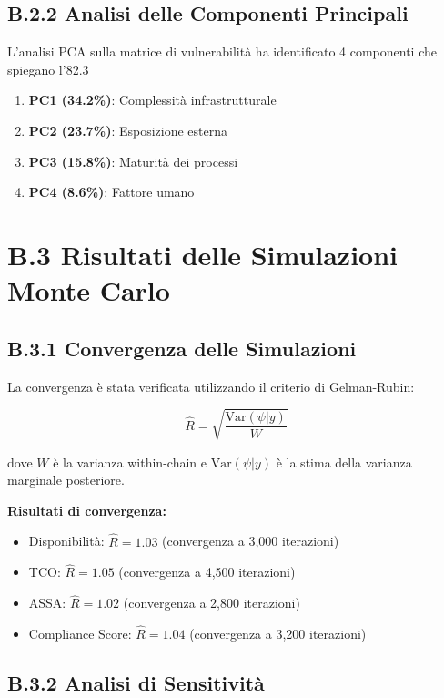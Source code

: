 \subsection{B.2.2 Analisi delle Componenti Principali}

L'analisi PCA sulla matrice di vulnerabilità ha identificato 4 componenti che spiegano l'82.3%

\begin{enumerate}
    \item \textbf{PC1 (34.2\%)}: Complessità infrastrutturale
    \item \textbf{PC2 (23.7\%)}: Esposizione esterna
    \item \textbf{PC3 (15.8\%)}: Maturità dei processi
    \item \textbf{PC4 (8.6\%)}: Fattore umano
\end{enumerate}

\section{B.3 Risultati delle Simulazioni Monte Carlo}

\subsection{B.3.1 Convergenza delle Simulazioni}

La convergenza è stata verificata utilizzando il criterio di Gelman-Rubin:

\begin{equation}
\hat{R} = \sqrt{\frac{\text{Var}(\psi|y)}{W}}
\end{equation}

dove $W$ è la varianza within-chain e $\text{Var}(\psi|y)$ è la stima della varianza marginale posteriore.

\textbf{Risultati di convergenza:}
\begin{itemize}
    \item Disponibilità: $\hat{R} = 1.03$ (convergenza a 3,000 iterazioni)
    \item TCO: $\hat{R} = 1.05$ (convergenza a 4,500 iterazioni)
    \item ASSA: $\hat{R} = 1.02$ (convergenza a 2,800 iterazioni)
    \item Compliance Score: $\hat{R} = 1.04$ (convergenza a 3,200 iterazioni)
\end{itemize}

\subsection{B.3.2 Analisi di Sensitività}

